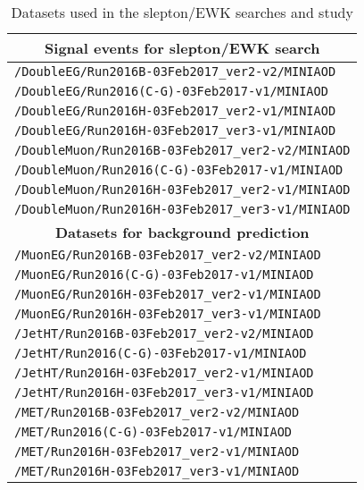 \begin{table}[ht!]
\def\arraystretch{1.2}
    \caption{Datasets used in the slepton/EWK searches and \ptmiss study}
    \label{tab:datasets}
    \begin{center}
        \begin{tabular}{ l}
        \hline\hline 
        \multicolumn{1}{c}{\textbf{Signal events for slepton/EWK search}} \\
        \hline
        \texttt{/DoubleEG/Run2016B-03Feb2017\_ver2-v2/MINIAOD}    \\
        \texttt{/DoubleEG/Run2016(C-G)-03Feb2017-v1/MINIAOD}     \\
        \texttt{/DoubleEG/Run2016H-03Feb2017\_ver2-v1/MINIAOD}    \\
        \texttt{/DoubleEG/Run2016H-03Feb2017\_ver3-v1/MINIAOD}    \\
        \texttt{/DoubleMuon/Run2016B-03Feb2017\_ver2-v2/MINIAOD}   \\
        \texttt{/DoubleMuon/Run2016(C-G)-03Feb2017-v1/MINIAOD}  \\
        \texttt{/DoubleMuon/Run2016H-03Feb2017\_ver2-v1/MINIAOD}    \\
        \texttt{/DoubleMuon/Run2016H-03Feb2017\_ver3-v1/MINIAOD}   \\
        \hline        
        \multicolumn{1}{c}{\textbf{Datasets for background prediction}} \\
        \hline
        \texttt{/MuonEG/Run2016B-03Feb2017\_ver2-v2/MINIAOD}    \\
        \texttt{/MuonEG/Run2016(C-G)-03Feb2017-v1/MINIAOD}    \\
        \texttt{/MuonEG/Run2016H-03Feb2017\_ver2-v1/MINIAOD}    \\
        \texttt{/MuonEG/Run2016H-03Feb2017\_ver3-v1/MINIAOD}    \\           
        \texttt{/JetHT/Run2016B-03Feb2017\_ver2-v2/MINIAOD}   \\
        \texttt{/JetHT/Run2016(C-G)-03Feb2017-v1/MINIAOD}   \\
        \texttt{/JetHT/Run2016H-03Feb2017\_ver2-v1/MINIAOD}    \\
        \texttt{/JetHT/Run2016H-03Feb2017\_ver3-v1/MINIAOD}   \\     
        \texttt{/MET/Run2016B-03Feb2017\_ver2-v2/MINIAOD}   \\
        \texttt{/MET/Run2016(C-G)-03Feb2017-v1/MINIAOD}   \\
        \texttt{/MET/Run2016H-03Feb2017\_ver2-v1/MINIAOD}    \\
        \texttt{/MET/Run2016H-03Feb2017\_ver3-v1/MINIAOD}   \\     
        \hline
\hline\hline
\end{tabular}
\end{center}
\end{table}                                                                                  

